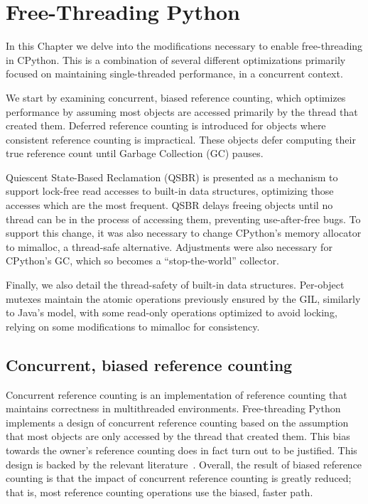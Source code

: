 \chapter{Free-Threading Python}\label{ch:free-threading-python}

In this Chapter we delve into the modifications necessary to enable free-thread\-ing in CPython.
This is a combination of several different optimizations primarily focused on maintaining single-threaded performance, in a concurrent context.

We start by examining concurrent, biased reference counting, which optimizes performance by assuming most objects are accessed primarily by the thread that created them.
Deferred reference counting is introduced for objects where consistent reference counting is impractical.
These objects defer computing their true reference count until Garbage Collection (GC) pauses.

Quiescent State-Based Reclamation (QSBR) is presented as a mechanism to support lock-free read accesses to built-in data structures, optimizing those accesses which are the most frequent.
QSBR delays freeing objects until no thread can be in the process of accessing them, preventing use-after-free bugs.
To support this change, it was also necessary to change CPython's memory allocator to mimalloc, a thread-safe alternative.
Adjustments were also necessary for CPython's GC, which so becomes a ``stop-the-world'' collector.

Finally, we also detail the thread-safety of built-in data structures.
Per-object mutexes maintain the atomic operations previously ensured by the GIL, similarly to Java's model, with some read-only operations optimized to avoid locking, relying on some modifications to mimalloc for consistency.


\section{Concurrent, biased reference counting}\label{sec:concurrent-biased-reference-counting}

Concurrent reference counting is an implementation of reference counting that maintains correctness in multithreaded environments.
Free-threading Python implements a design of concurrent reference counting based on the assumption that most objects are only accessed by the thread that created them.
This bias towards the owner's reference counting does in fact turn out to be justified.
This design is backed by the relevant literature~\cite{biased-refcounting}.
Overall, the result of biased reference counting is that the impact of concurrent reference counting is greatly reduced; that is, most reference counting operations use the biased, faster path.

